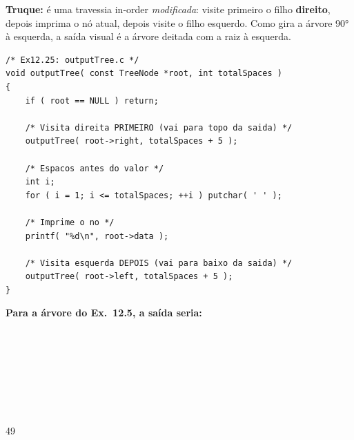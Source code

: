 \documentclass[12pt,a4paper]{article}
\begin{document}
\begin{respostabox}
\textbf{Truque:} é uma travessia in-order \textit{modificada}: visite primeiro
o filho \textbf{direito}, depois imprima o nó atual, depois visite o filho
esquerdo. Como gira a árvore 90° à esquerda, a saída visual é a árvore deitada
com a raiz à esquerda.

\begin{lstlisting}
/* Ex12.25: outputTree.c */
void outputTree( const TreeNode *root, int totalSpaces )
{
    if ( root == NULL ) return;

    /* Visita direita PRIMEIRO (vai para topo da saida) */
    outputTree( root->right, totalSpaces + 5 );

    /* Espacos antes do valor */
    int i;
    for ( i = 1; i <= totalSpaces; ++i ) putchar( ' ' );

    /* Imprime o no */
    printf( "%d\n", root->data );

    /* Visita esquerda DEPOIS (vai para baixo da saida) */
    outputTree( root->left, totalSpaces + 5 );
}
\end{lstlisting}

\textbf{Para a árvore do Ex.~12.5, a saída seria:}
\begin{saida}
\quad\quad\quad\quad\quad\quad\quad\quad\quad\quad\quad\quad\quad{}\\
\quad\quad\quad\quad\quad\quad\quad\quad\quad{}\\
\quad\quad\quad\quad\quad\quad\quad\quad\quad\quad\quad\quad\quad{}\\
\quad\quad\quad\quad{}\\
\quad\quad\quad\quad\quad\quad\quad\quad\quad\quad\quad\quad\quad{}\\
\quad\quad\quad\quad\quad\quad\quad\quad\quad{}\\
\quad\quad\quad\quad\quad\quad\quad\quad\quad\quad\quad\quad\quad{}\\
49\\
\quad\quad\quad\quad\quad\quad\quad\quad\quad\quad\quad\quad\quad{}\\
\quad\quad\quad\quad\quad\quad\quad\quad\quad{}\\
\quad\quad\quad\quad\quad\quad\quad\quad\quad\quad\quad\quad\quad{}\\
\quad\quad\quad\quad{}\\
\quad\quad\quad\quad\quad\quad\quad\quad\quad\quad\quad\quad\quad{}\\
\quad\quad\quad\quad\quad\quad\quad\quad\quad{}\\
\quad\quad\quad\quad\quad\quad\quad\quad\quad\quad\quad\quad\quad{}
\end{saida}


\end{respostabox}
\end{document}

